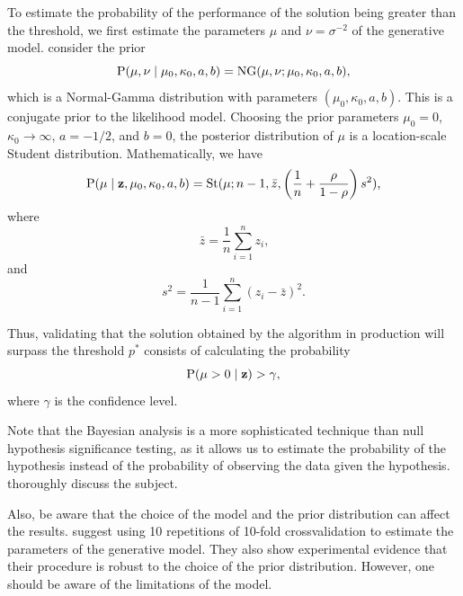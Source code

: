 To estimate the probability of the performance of the solution being greater than the
threshold, we first estimate the parameters $\mu$ and $\nu = \sigma^{-2}$ of the
generative model.  \citeauthor{Benavoli2017} consider the prior
\begin{equation*}
  \operatorname{P}(\mu, \nu \mid \mu_0, \kappa_0, a, b) = \operatorname{NG}(\mu, \nu; \mu_0, \kappa_0, a, b)\text{,}
\end{equation*}
which is a Normal-Gamma distribution with parameters $(\mu_0, \kappa_0, a, b)$.  This is a
conjugate prior to the likelihood model.  Choosing the prior parameters $\mu_0 = 0$,
$\kappa_0 \to \infty$, $a = -1/2$, and $b = 0$, the posterior distribution of $\mu$ is a
location-scale Student distribution.  Mathematically, we have
\begin{equation*}
  \operatorname{P}(\mu \mid \mathbf{z}, \mu_0, \kappa_0, a, b) =
    \operatorname{St}(\mu; n - 1, \bar{z}, \left(
      \frac{1}{n} + \frac{\rho}{1 - \rho}
    \right)s^2)\text{,}
\end{equation*}
where
\begin{equation*}
  \bar{z} = \frac{1}{n} \sum_{i=1}^n z_i\text{,}
\end{equation*}
and
\begin{equation*}
  s^2 = \frac{1}{n - 1} \sum_{i=1}^{n} (z_i - \bar{z})^2\text{.}
\end{equation*}

Thus, validating that the solution obtained by the algorithm in production will surpass
the threshold $p^{*}$ consists of calculating the probability
\begin{equation*}
  \operatorname{P}(\mu > 0 \mid \mathbf{z}) > \gamma\text{,}
\end{equation*}
where $\gamma$ is the confidence level.

Note that the Bayesian analysis is a more sophisticated technique than null hypothesis
significance testing, as it allows us to estimate the probability of the hypothesis
instead of the probability of observing the data given the hypothesis.
\textcite{Benavoli2017} thoroughly discuss the subject.

Also, be aware that the choice of the model and the prior distribution can affect the
results.  \citeauthor{Benavoli2017} suggest using 10 repetitions of 10-fold \gls{crossvalidation}
to estimate the parameters of the generative model.  They also show experimental evidence
that their procedure is robust to the choice of the prior distribution.  However, one
should be aware of the limitations of the model.

